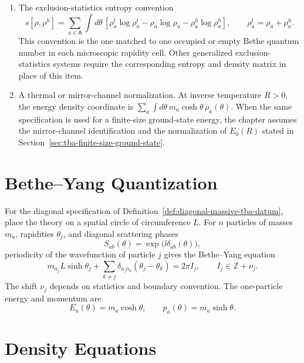 \begin{definition}
\begin{enumerate}[label=\textup{(\roman*)}]
      \(\rho_a^h(\theta)\dd\theta\), and the differentiated Bethe--Yang map
      gives the density constraint
      \[
        \rho_a+\rho_a^h
        =
        \frac{m_a}{2\pi}\cosh\theta
        +
        \sum_{b\in\mathsf A}\varphi_{ab}\ast\rho_b .
      \]
\item The exclusion-statistics entropy convention
      \[
        s[\rho,\rho^h]
        =
        \sum_{a\in\mathsf A}\int d\theta\,
        \left[
        \rho_a^t\log\rho_a^t
        -\rho_a\log\rho_a
        -\rho_a^h\log\rho_a^h
        \right],
        \qquad
        \rho_a^t=\rho_a+\rho_a^h .
      \]
      This convention is the one matched to one occupied or empty Bethe
      quantum number in each microscopic rapidity cell.  Other generalized
      exclusion-statistics systems require the corresponding entropy and
      density matrix in place of this item.
\item A thermal or mirror-channel normalization.  At inverse temperature
      \(R>0\), the energy density coordinate is
      \(\sum_a\int d\theta\,m_a\cosh\theta\,\rho_a(\theta)\).  When the same
      specification is used for a finite-size ground-state energy, the chapter assumes
      the mirror-channel identification and the normalization of
      \(E_0(R)\) stated in Section~\ref{sec:tba-finite-size-ground-state}.
\end{enumerate}
\end{definition}

\section{Bethe--Yang Quantization}

For the diagonal specification of
Definition~\ref{def:diagonal-massive-tba-datum}, place the theory on a
spatial circle of circumference \(L\).  For \(n\) particles of masses \(m_a\),
rapidities \(\theta_j\), and diagonal scattering phases
\[
  S_{ab}(\theta)=\exp\!\bigl(\ii\delta_{ab}(\theta)\bigr),
\]
periodicity of the wavefunction of particle \(j\) gives the Bethe--Yang
equation
\[
  m_{a_j}L\sinh\theta_j
  +\sum_{k\neq j}\delta_{a_ja_k}(\theta_j-\theta_k)
  =
  2\pi I_j,
  \qquad I_j\in\mathbb Z+\nu_j .
\]
The shift \(\nu_j\) depends on statistics and boundary convention.  The
one-particle energy and momentum are
\[
  E_a(\theta)=m_a\cosh\theta,\qquad
  p_a(\theta)=m_a\sinh\theta .
\]

\section{Density Equations}

